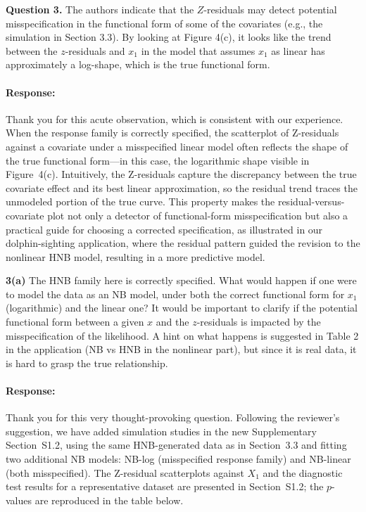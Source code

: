 \documentclass[11pt]{article}
\newcommand*{\mybox}[2]{%
  \par\medskip\noindent
  \colorbox{#1!30}{\parbox{.98\linewidth}{#2}}%
  \par\medskip
}
\begin{document}
\medskip

\mybox{gray}{\textbf{Question 3.} The authors indicate that the $Z$-residuals may detect potential misspecification in the functional form of some of the covariates (e.g., the simulation in Section 3.3). By looking at Figure 4(c), it looks like the trend between the $z$-residuals and $x_1$ in the model that assumes $x_1$ as linear has approximately a log-shape, which is the true functional form.
}

\paragraph{Response:}
Thank you for this acute observation, which is consistent with our experience. When the response family is correctly specified, the scatterplot of Z-residuals against a covariate under a misspecified linear model often reflects the shape of the true functional form---in this case, the logarithmic shape visible in Figure~4(c). Intuitively, the Z-residuals capture the discrepancy between the true covariate effect and its best linear approximation, so the residual trend traces the unmodeled portion of the true curve. This property makes the residual-versus-covariate plot not only a detector of functional-form misspecification but also a practical guide for choosing a corrected specification, as illustrated in our dolphin-sighting application, where the residual pattern guided the revision to the nonlinear HNB model, resulting in a more predictive model.
\mybox{gray}{
\textbf{3(a)} The HNB family here is correctly specified. What would happen if one were to model the data as an NB model, under both the correct functional form for $x_1$ (logarithmic) and the linear one? It would be important to clarify if the potential functional form between a given $x$ and the $z$-residuals is impacted by the misspecification of the likelihood. A hint on what happens is suggested in Table 2 in the application (NB vs HNB in the nonlinear part), but since it is real data, it is hard to grasp the true relationship.}

\paragraph{Response:}
Thank you for this very thought-provoking question. Following the
reviewer's suggestion, we have added simulation studies in the new
Supplementary Section~S1.2, using the same HNB-generated data as in
Section~3.3 and fitting two additional NB models: NB-log (misspecified
response family) and NB-linear (both misspecified). The Z-residual
scatterplots against $X_1$ and the diagnostic test results for a
representative dataset are presented in Section~S1.2; the $p$-values are
reproduced in the table below.
\end{document}
